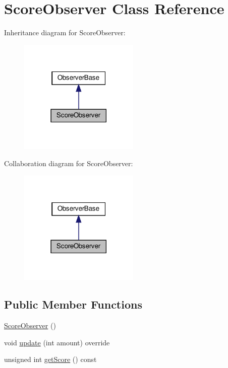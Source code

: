 \hypertarget{classScoreObserver}{}\section{Score\+Observer Class Reference}
\label{classScoreObserver}


Inheritance diagram for Score\+Observer\+:\nopagebreak
\begin{figure}[H]
\begin{center}
\leavevmode
\includegraphics[width=162pt]{classScoreObserver__inherit__graph}
\end{center}
\end{figure}


Collaboration diagram for Score\+Observer\+:\nopagebreak
\begin{figure}[H]
\begin{center}
\leavevmode
\includegraphics[width=162pt]{classScoreObserver__coll__graph}
\end{center}
\end{figure}
\subsection*{Public Member Functions}
\begin{DoxyCompactItemize}
\item 
\hyperlink{classScoreObserver_a29bf728993aedfded2ecf7c16df701cf}{Score\+Observer} ()
\item 
void \hyperlink{classScoreObserver_ad1b2727dbdc1f47de4b118a22fbdc12e}{update} (int amount) override
\item 
unsigned int \hyperlink{classScoreObserver_a99e163d5b7a3b53cdd9ae808a253235e}{get\+Score} () const
\end{DoxyCompactItemize}


